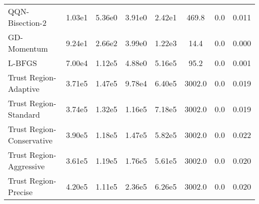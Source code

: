 \documentclass{article}
\begin{document}
\begin{table}[htbp]
{\begin{tabular}{p{2.5cm}*{7}{c}}
QQN-Bisection-2 & 1.03e1 & 5.36e0 & 3.91e0 & 2.42e1 & 469.8 & 0.0 & 0.011 \\
GD-Momentum & 9.24e1 & 2.66e2 & 3.99e0 & 1.22e3 & 14.4 & 0.0 & 0.000 \\
L-BFGS & 7.00e4 & 1.12e5 & 4.88e0 & 5.16e5 & 95.2 & 0.0 & 0.001 \\
Trust Region-Adaptive & 3.71e5 & 1.47e5 & 9.78e4 & 6.40e5 & 3002.0 & 0.0 & 0.019 \\
Trust Region-Standard & 3.74e5 & 1.32e5 & 1.16e5 & 7.18e5 & 3002.0 & 0.0 & 0.019 \\
Trust Region-Conservative & 3.90e5 & 1.18e5 & 1.47e5 & 5.82e5 & 3002.0 & 0.0 & 0.022 \\
Trust Region-Aggressive & 3.61e5 & 1.19e5 & 1.76e5 & 5.61e5 & 3002.0 & 0.0 & 0.020 \\
Trust Region-Precise & 4.20e5 & 1.11e5 & 2.36e5 & 6.26e5 & 3002.0 & 0.0 & 0.020 \\
\bottomrule
\end{tabular}
}
\end{table}
\end{document}

